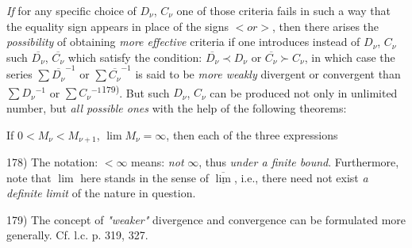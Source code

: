 \textit{If} for any specific choice of $D_\nu$, $C_\nu$ one of those criteria fails in such a way that the equality sign appears in place of the signs $ < or > $, then there arises the \textit{possibility} of obtaining \textit{more effective} criteria if one introduces instead of $D_\nu$, $C_\nu$ such $\overline{D_\nu}$, $\overline{C_\nu}$ which satisfy the condition: $\overline{D_\nu} \prec D_\nu$ or $\overline{C_\nu} \succ C_\nu$, in which case the series $\sum \overline{D_\nu}^{-1}$ or $\sum \overline{C_\nu}^{-1}$ is said to be \textit{more weakly} divergent or convergent than $\sum D_\nu{}^{-1}$ or $\sum C_\nu{}^{-1}$\textsuperscript{179)}. But such $D_\nu$, $C_\nu$ can be produced not only in unlimited number, but \textit{all possible ones} with the help of the following theorems:

If $0 < M_\nu < M_{\nu+1}$, $\lim M_\nu = \infty$, then each of the three expressions

\vfill
\leftline{\rule{2in}{0.4pt}}
\vspace{0.2cm}
{
\footnotesize
178) The notation: $< \infty$ means: \textit{not} $\infty$, thus \textit{under a finite bound}. Furthermore, note that $\lim$ here stands in the sense of $\overline{\underline{\lim}}$, i.e., there need not exist \textit{a definite limit} of the nature in question.

179) The concept of \textit{"weaker"} divergence and convergence can be formulated more generally. Cf. l.c. p. 319, 327.

}